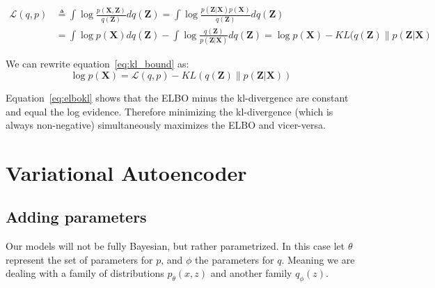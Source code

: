 \documentclass[11pt, a4paper]{report}
\theoremstyle{plain}
\theoremstyle{definition}
\theoremstyle{remark}
\newcommand{\bv}[1]{\boldsymbol{#1}}
\begin{document}
\begin{equation}\label{eq:kl_bound}
\begin{aligned}
\mathcal{L}(q,p) &\triangleq \int \log \frac{p(\bv{X},\bv{Z})}{q(\bv{Z})} d
q(\bv{Z})
= \int \log \frac{p(\bv{Z}|\bv{X})p(\bv{X})}{q(\bv{Z})} d q(\bv{Z}) \\
&= \int \log p(\bv{X}) dq(\bv{Z}) - \int \log \frac{q(\bv{Z})}{p(\bv{Z}|\bv{X})}
dq(\bv{Z}) 
= \log p(\bv{X}) - KL(q(\bv{Z}) \| p(\bv{Z}|\bv{X})
\end{aligned}
\end{equation}

We can rewrite equation~\ref{eq:kl_bound} as:
\begin{equation}\label{eq:elbokl}
\log p(\bv{X}) = \mathcal{L}(q,p) - KL(q(\bv{Z}) \| p(\bv{Z}|\bv{X}))
\end{equation}

Equation~\ref{eq:elbokl} shows that the ELBO minus the kl-divergence are constant
and equal the log evidence. Therefore minimizing the kl-divergence (which is
always non-negative) simultaneously maximizes the ELBO and vicer-versa.

%

\section{Variational Autoencoder}
\subsection{Adding parameters}

Our models will not be fully Bayesian, but rather parametrized.
In this case let $\theta$ represent the set of parameters for $p$, and $\phi$
the parameters for $q$. Meaning we are dealing with a family of distributions
$p_{\theta}(x,z)$ and another family $q_{\phi}(z)$.
\end{document}
